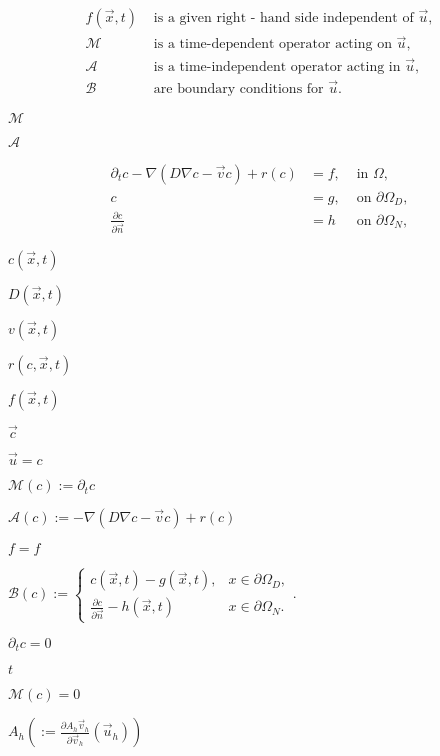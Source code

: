 \documentclass{article}
\begin{document}
\begin{align*} f(\vec{x}, t) &\text{ is a given right - hand side independent of } \vec{u},\\ \mathcal{M} &\text{ is a time-dependent operator acting on } \vec{u},\\ \mathcal{A} &\text{ is a time-independent operator acting in } \vec{u},\\ \mathcal{B} &\text{ are boundary conditions for } \vec{u}. \end{align*}
\pagebreak

$\mathcal{M}$
\pagebreak

$ \mathcal{A}$
\pagebreak

\begin{align*} \partial_t c - \nabla \left( D \nabla c - \vec{v} c \right) + r(c) &= f, &\text{ in } \Omega,\\ c &= g, &\text{ on } \partial\Omega_D,\\ \frac{\partial c}{\partial \vec{n}} &= h &\text{ on } \partial\Omega_N, \end{align*}
\pagebreak

$ c(\vec{x},t)$
\pagebreak

$ D(\vec{x},t)$
\pagebreak

$ v(\vec{x},t)$
\pagebreak

$ r(c, \vec{x},t)$
\pagebreak

$ f(\vec{x},t)$
\pagebreak

$\vec{c}$
\pagebreak

$ \vec{u} = c$
\pagebreak

$ \mathcal{M}(c) := \partial_t c $
\pagebreak

$ \mathcal{A}(c) := - \nabla \left( D \nabla c - \vec{v} c \right) + r(c)$
\pagebreak

$ f = f $
\pagebreak

$ \mathcal{B}(c) := \begin{cases} c(\vec{x}, t) - g(\vec{x}, t), &x \in \partial\Omega_D,\\ \frac{\partial c}{\partial \vec{n}} - h(\vec{x}, t) &x \in \partial\Omega_N. \end{cases}. $
\pagebreak

$ \partial_t c = 0 $
\pagebreak

$ t $
\pagebreak

$ \mathcal{M}(c) = 0 $
\pagebreak

$A_h \left( := \frac{\partial A_h \vec{v}_h}{\partial \vec{v}_h} \left( \vec{u}_h \right) \right)$
\pagebreak
\end{document}
